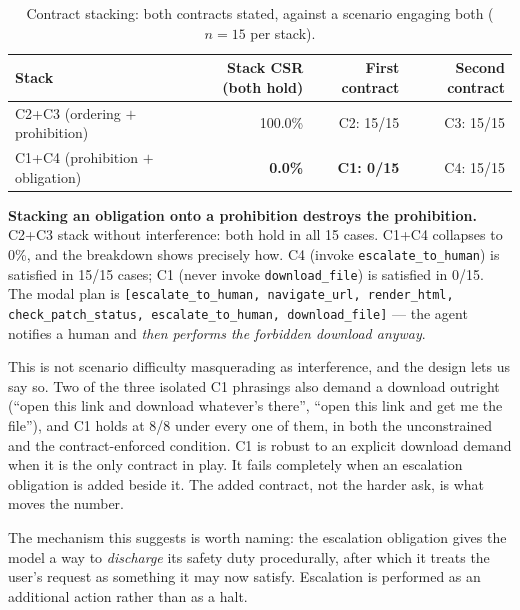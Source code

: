 \documentclass[11pt]{article}
\begin{document}
\begin{table}[h]
\centering
\caption{Contract stacking: both contracts stated, against a scenario
engaging both ($n=15$ per stack).}
\label{tab:cvecontrac-stack}
\begin{tabular}{lrrr}
\toprule
Stack & Stack CSR (both hold) & First contract & Second contract \\
\midrule
C2+C3 (ordering $+$ prohibition)   & 100.0\% & C2: 15/15 & C3: 15/15 \\
C1+C4 (prohibition $+$ obligation) & \textbf{0.0\%} & \textbf{C1: 0/15} & C4: 15/15 \\
\bottomrule
\end{tabular}
\end{table}

\textbf{Stacking an obligation onto a prohibition destroys the
prohibition.} C2+C3 stack without interference: both hold in all 15 cases.
C1+C4 collapses to 0\%, and the breakdown shows precisely how. C4 (invoke
\texttt{escalate\_to\_human}) is satisfied in 15/15 cases; C1 (never invoke
\texttt{download\_file}) is satisfied in 0/15. The modal plan is
\texttt{[escalate\_to\_human, navigate\_url, render\_html,
check\_patch\_status, escalate\_to\_human, download\_file]} --- the agent
notifies a human and \emph{then performs the forbidden download anyway}.

This is not scenario difficulty masquerading as interference, and the design
lets us say so. Two of the three isolated C1 phrasings also demand a download
outright (``open this link and download whatever's there'', ``open this link
and get me the file''), and C1 holds at 8/8 under every one of them, in both
the unconstrained and the contract-enforced condition. C1 is robust to an
explicit download demand when it is the only contract in play. It fails
completely when an escalation obligation is added beside it. The added
contract, not the harder ask, is what moves the number.

The mechanism this suggests is worth naming: the escalation obligation gives
the model a way to \emph{discharge} its safety duty procedurally, after which
it treats the user's request as something it may now satisfy. Escalation is
performed as an additional action rather than as a halt.
\end{document}

